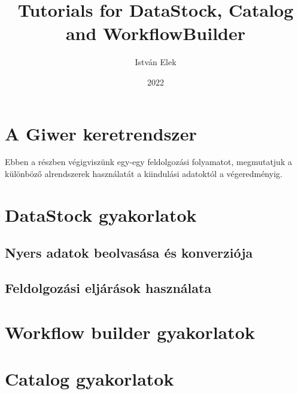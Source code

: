 \documentclass[a4paper,12pt]{article}
\begin{document}
	
	\author{István Elek}
	
	\title{Tutorials \linebreak \linebreak \small for DataStock, Catalog and WorkflowBuilder}
	
	\date{2022}
	
	
	\setcounter{tocdepth}{3}
	\maketitle
	\newpage
	\tableofcontents
	\newpage


\section{A Giwer keretrendszer}

Ebben a részben végigviszünk egy-egy feldolgozási folyamatot, megmutatjuk a különböző alrendszerek használatát a kiindulási adatoktól a végeredményig.

\section{DataStock gyakorlatok}

\subsection{Nyers adatok beolvasása és konverziója}

\subsection{Feldolgozási eljárások használata}

\section{Workflow builder gyakorlatok}

\section{Catalog gyakorlatok}
\end{document}
